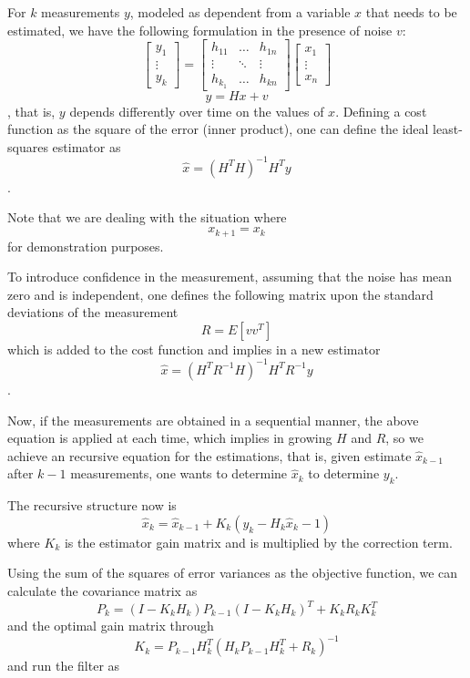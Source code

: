 For $k$ measurements $y$, modeled as dependent from a variable $x$ that needs to be estimated, we have the following formulation in the presence of noise $v$: \[
    \begin{bmatrix} y_1\\ \vdots\\ y_k \end{bmatrix}=\begin{bmatrix} h_{11} & \ldots & h_{1n} \\ \vdots & \ddots & \vdots \\ h_{k_1} & \ldots & h_{kn} \end{bmatrix} \begin{bmatrix} x_1\\ \vdots\\ x_n \end{bmatrix}
\] \[
y=Hx+v
\], that is, $y$ depends differently over time on the values of $x$. Defining a cost function as the square of the error (inner product), one can define the ideal least-squares estimator as \[
\hat{x}=\left( H^{T}H \right) ^{-1}H^{T}y
\] .

Note that we are dealing with the situation where \[
x_{k+1} = x_k
\] for demonstration purposes.

To introduce confidence in the measurement, assuming that the noise has mean zero and is independent, one defines the following matrix upon the standard deviations of the measurement \[
R = E\left[ vv^{T} \right] 
\] which is added to the cost function and implies in a new estimator \[
\hat{x}=\left( H^{T}R^{-1}H \right) ^{-1}H^{T}R^{-1}y
\] .

Now, if the measurements are obtained in a sequential manner, the above equation is applied at each time, which implies in growing $H$ and $R$, so we achieve an recursive equation for the estimations, that is, given estimate $\hat{x}_{k-1}$ after $k-1$ measurements, one wants to determine $\hat{x}_k$ to determine $y_k$.

The recursive structure now is
\begin{equation}\label{x_k_equation}
    \hat{x}_k=\hat{x}_{k-1}+K_k\left( y_k-H_k\hat{x}_k-1 \right) 
\end{equation}
where $K_k$ is the estimator gain matrix and is multiplied by the correction term.

Using the sum of the squares of error variances as the objective function, we can calculate the covariance matrix as
\begin{equation}\label{P_k_equation}
    P_k = \left( I-K_kH_k \right) P_{k-1}\left( I-K_kH_k \right)^{T} + K_kR_kK_k^{T}
\end{equation}
and the optimal gain matrix through
\begin{equation}\label{K_k_equation}
    K_k=P_{k-1}H_k^{T}\left( H_kP_{k-1}H_k^{T}+R_k \right) ^{-1}
\end{equation}
and run the filter as

